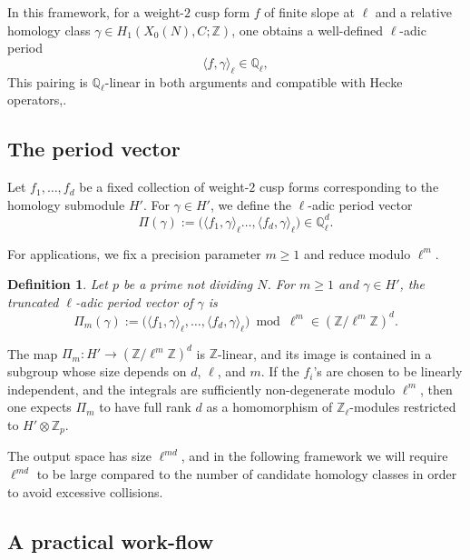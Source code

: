 \documentclass[10pt]{amsart}
\theoremstyle{theostyle}
\newtheorem{definition}[theorem]{Definition}
\newcommand{\QQ}{\mathbb{Q}} \newcommand{\RR}{\mathbb{R}}
\newcommand{\ZZ}{\mathbb{Z}}
\begin{document}
In this framework, for a weight-$2$ cusp form $f$ of finite slope at $\ell$ and
a relative homology class $\gamma \in H_1(X_0(N),C;\ZZ)$, one obtains a
well-defined $\ell$-adic period
\[
\langle f,\gamma\rangle_\ell \in \QQ_\ell,
\]
This pairing is $\QQ_\ell$-linear in both arguments and compatible with Hecke
operators,.

\subsection{The period vector}
\label{ssubec:periodvector}

Let $f_1,\dots,f_d$ be a fixed collection of weight-$2$ cusp forms corresponding
to the homology submodule $H'$. %
For $\gamma\in H'$, we define the %
$\ell$-adic period vector
\[
\Pi(\gamma) :=
\bigl(\langle f_1,\gamma\rangle_\ell\dots,\langle f_d,\gamma\rangle_\ell\bigr)
\in \QQ_\ell^d.
\]

For applications, we fix a
precision parameter $m\ge 1$ and reduce modulo $\ell^m$.

\begin{definition}
	Let $p$ be a prime %
	not dividing $N$.
	For $m\ge 1$ and $\gamma\in H'$, the \emph{truncated $\ell$-adic period vector}
	of $\gamma$ is
	\[
	\Pi_m(\gamma)
	:= \bigl(\langle f_1,\gamma\rangle_\ell,\dots,
	\langle f_d,\gamma\rangle_\ell\bigr)
	\bmod \ell^m
	\in (\ZZ/\ell^m\ZZ)^d.
	\]
\end{definition}

The map $\Pi_m:H'\to(\ZZ/\ell^m\ZZ)^d$ is $\ZZ$-linear, and its image is contained
in a subgroup whose size depends on $d$, $\ell$, and $m$. If the $f_i$'s are
chosen to be linearly independent, and the integrals are
sufficiently non-degenerate modulo $\ell^m$, then one expects $\Pi_m$ to have
full rank $d$ as a homomorphism of $\ZZ_\ell$-modules restricted to $H'\otimes\ZZ_p$.

The output space has size $\ell^{md}$, and in the following framework we will require
$\ell^{md}$ to be large compared to the number of candidate homology classes
in order to avoid excessive collisions. 


\subsection{A practical work-flow}
\label{sec:example}
\end{document}
